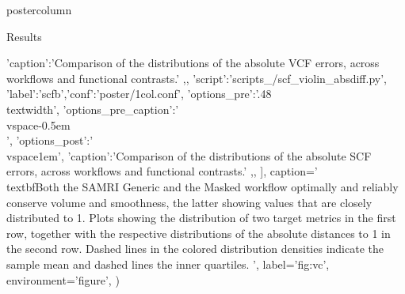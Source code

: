 \begin{frame}
\begin{columns}
\begin{column}{.59\textwidth}
\begin{beamercolorbox}[center]{postercolumn}
\begin{minipage}{.95\textwidth}
{\begin{myblock}{Results}
\begin{sansmath}
{{                                        'caption':'Comparison of the distributions of the absolute VCF errors, across workflows and functional contrasts.'
                                        ,},
                                            {'script':'scripts_/scf_violin_absdiff.py', 'label':'scfb','conf':'poster/1col.conf', 'options_pre':'{.48\\textwidth}',
                                        'options_pre_caption':'\\vspace{-0.5em}\\',
                                        'options_post':'\\vspace{1em}',
                                        'caption':'Comparison of the distributions of the absolute SCF errors, across workflows and functional contrasts.'
                                        ,},
                                        ],
                                        caption='\\textbf{Both the SAMRI Generic and the Masked workflow optimally and reliably conserve volume and smoothness, the latter showing values that are closely distributed to 1.}
                                        Plots showing the distribution of two target metrics in the first row, together with the respective distributions of the absolute distances to 1 in the second row. Dashed lines in the colored distribution densities indicate the sample mean and dashed lines the inner quartiles.
                                        ',
                                        label='fig:vc',
                                        environment='figure',
                                        )}
                                \end{sansmath}
                            \end{myblock}

}
\end{minipage}
\end{beamercolorbox}
\end{column}
\end{columns}
\end{frame}
